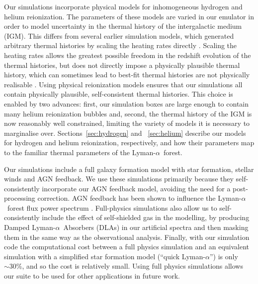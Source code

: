 \documentclass[a4paper,11pt]{article}
\newcommand{\Lya}{Lyman-$\alpha$}
\begin{document}
Our simulations incorporate physical models for inhomogeneous hydrogen and helium reionization. The parameters of these models are varied in our emulator in order to model uncertainty in the thermal history of the intergalactic medium (IGM).
This differs from several earlier simulation models, which generated arbitrary thermal histories by scaling the heating rates directly \cite[e.g.~][]{Viel:2006, Viel:2013wdm, Irsic:2017, Garzilli:2019}. Scaling the heating rates allows the greatest possible freedom in the redshift evolution of the thermal histories, but does not directly impose a physically plausible thermal history, which can sometimes lead to best-fit thermal histories are not physically realisable \cite{Walther:2019}.
Using physical reionization models ensures that our simulations all contain physically plausible, self-consistent thermal histories. This choice is enabled by two advances: first, our simulation boxes are large enough to contain many helium reionization bubbles and, second, the thermal history of the IGM is now reasonably well constrained, limiting the variety of models it is necessary to marginalise over.
Sections~\ref{sec:hydrogen} and ~\ref{sec:helium} describe our models for hydrogen and helium reionization, respectively, and how their parameters map to the familiar thermal parameters of the \Lya~forest.

Our simulations include a full galaxy formation model with star formation, stellar winds and AGN feedback. We use these simulations primarily because they self-consistently incorporate our AGN feedback model, avoiding the need for a post-processing correction. AGN feedback has been shown to influence the \Lya~forest flux power spectrum \cite{Viel:2013, Chabanier:2020}. Full-physics simulations also allow us to self-consistently include the effect of self-shielded gas in the modelling, by producing Damped \Lya~Absorbers (DLAs) in our artificial spectra and then masking them in the same way as the observational analysis.
Finally, with our simulation code the computational cost between a full physics simulation and an equivalent simulation with a simplified star formation model (``quick \Lya'') is only $\sim 30\%$, and so the cost is relatively small. Using full physics simulations allows our suite to be used for other applications in future work.
\end{document}
